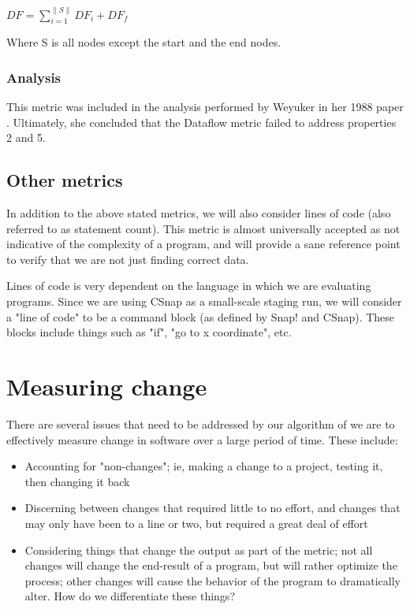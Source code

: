 \documentclass[]{article}
\begin{document}
$DF = \sum\limits_{i=1}^{\parallel S \parallel} DF_i+DF_f$

Where S is all nodes except the start and the end nodes.


\subsubsection{Analysis}

This metric was included in the analysis performed by Weyuker in her 1988 paper \cite{ref:evaluating_software_complexity_measures}.
Ultimately, she concluded that the Dataflow metric failed to address properties 2 and 5.

\subsection{Other metrics}

In addition to the above stated metrics, we will also consider lines of code (also referred to as statement count).
This metric is almost universally accepted as not indicative of the complexity of a program, and will provide a sane reference point to verify that we are not just finding correct data.

Lines of code is very dependent on the language in which we are evaluating programs.
Since we are using CSnap as a small-scale staging run, we will consider a "line of code" to be a command block (as defined by Snap! and CSnap).
These blocks include things such as "if", "go to {x coordinate}", etc.

\section{Measuring change}




There are several issues that need to be addressed by our algorithm of we are to effectively measure change in software over a large period of time.
These include:
\begin{itemize}
	\item Accounting for "non-changes"; ie, making a change to a project, testing it, then changing it back
	\item Discerning between changes that required little to no effort, and changes that may only have been to a line or two, but required a great deal of effort
	\item Considering things that change the output as part of the metric; not all changes will change the end-result of a program, but will rather optimize the process; other changes will cause the behavior of the program to dramatically alter. How do we differentiate these things?
\end{itemize}
\end{document}
